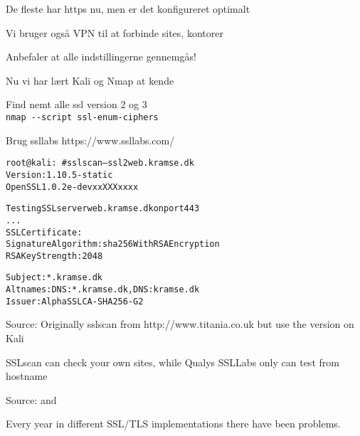 \documentclass[Screen16to9,17pt]{foils}
\begin{document}
\begin{list2}
\item De fleste har https nu, men er det konfigureret optimalt
\item Vi bruger også VPN til at forbinde sites, kontorer
\item Anbefaler at alle indstillingerne gennemgås!
\end{list2}



\begin{list1}
\item Nu vi har lært Kali og Nmap at kende
\begin{list2}
\item Find nemt alle ssl version 2 og 3\\
\verb+nmap --script ssl-enum-ciphers+
\item Brug ssllabs https://www.ssllabs.com/
\end{list2}
\end{list1}



\begin{alltt}\small
root@kali:~# sslscan --ssl2 web.kramse.dk
Version: 1.10.5-static
OpenSSL 1.0.2e-dev xx XXX xxxx

Testing SSL server web.kramse.dk on port 443
...
  SSL Certificate:
Signature Algorithm: sha256WithRSAEncryption
RSA Key Strength:    2048

Subject:  *.kramse.dk
Altnames: DNS:*.kramse.dk, DNS:kramse.dk
Issuer:   AlphaSSL CA - SHA256 - G2
\end{alltt}

Source:
Originally sslscan from http://www.titania.co.uk
 but use the version on Kali

SSLscan can check your own sites, while Qualys SSLLabs only can test from hostname










Source:  and \\

Every year in different SSL/TLS implementations there have been problems.
\end{document}
